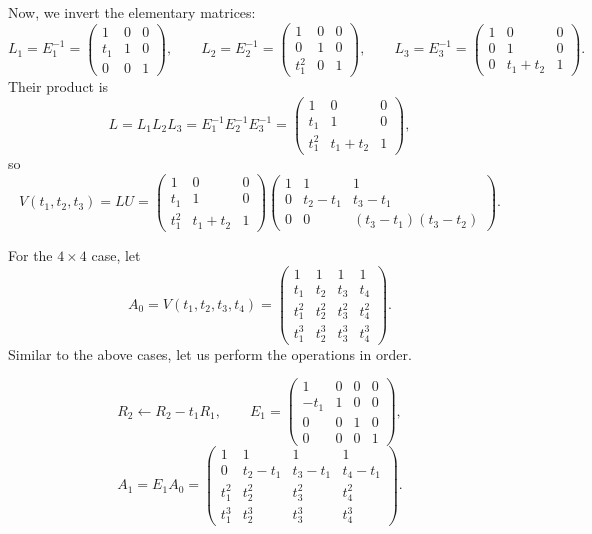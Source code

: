 \documentclass[10pt]{extarticle}
\begin{document}
Now, we invert the elementary matrices:
\[
L_1=E_1^{-1}=
\begin{pmatrix}
1 & 0 & 0\\
t_1 & 1 & 0\\
0 & 0 & 1
\end{pmatrix},
\qquad
L_2=E_2^{-1}=
\begin{pmatrix}
1 & 0 & 0\\
0 & 1 & 0\\
t_1^2 & 0 & 1
\end{pmatrix},
\qquad
L_3=E_3^{-1}=
\begin{pmatrix}
1 & 0 & 0\\
0 & 1 & 0\\
0 & t_1+t_2 & 1
\end{pmatrix}.
\]
Their product is
\[
L=L_1L_2L_3=E_1^{-1}E_2^{-1}E_3^{-1}=
\begin{pmatrix}
1 & 0 & 0\\
t_1 & 1 & 0\\
t_1^2 & t_1+t_2 & 1
\end{pmatrix},
\]
so
\[
V(t_1,t_2,t_3)=LU=
\begin{pmatrix}
1 & 0 & 0\\
t_1 & 1 & 0\\
t_1^2 & t_1+t_2 & 1
\end{pmatrix}
\begin{pmatrix}
1 & 1 & 1\\
0 & t_2-t_1 & t_3-t_1\\
0 & 0 & (t_3-t_1)(t_3-t_2)
\end{pmatrix}.
\]

For the $4\times 4$ case, let
\[
A_0=V(t_1,t_2,t_3,t_4)=
\begin{pmatrix}
1 & 1 & 1 & 1\\
t_1 & t_2 & t_3 & t_4\\
t_1^2 & t_2^2 & t_3^2 & t_4^2\\
t_1^3 & t_2^3 & t_3^3 & t_4^3
\end{pmatrix}.
\]
Similar to the above cases, let us perform the operations in order.

\[
R_2\leftarrow R_2-t_1R_1,
\qquad
E_1=
\begin{pmatrix}
1 & 0 & 0 & 0\\
-t_1 & 1 & 0 & 0\\
0 & 0 & 1 & 0\\
0 & 0 & 0 & 1
\end{pmatrix},
\]
\[
A_1=E_1A_0=
\begin{pmatrix}
1 & 1 & 1 & 1\\
0 & t_2-t_1 & t_3-t_1 & t_4-t_1\\
t_1^2 & t_2^2 & t_3^2 & t_4^2\\
t_1^3 & t_2^3 & t_3^3 & t_4^3
\end{pmatrix}.
\]
\end{document}
